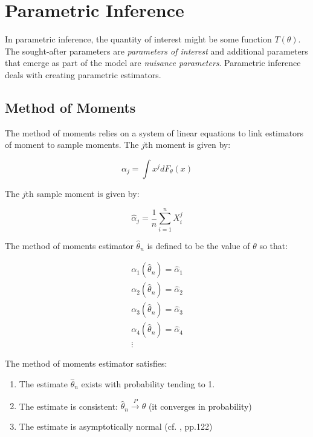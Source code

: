 \section{Parametric Inference}

In parametric inference, the quantity of interest might be some function $T(\theta)$. The sought-after parameters are \textit{parameters of interest} and additional parameters that emerge as part of the model are \textit{nuisance parameters}. Parametric inference deals with creating parametric estimators.

\subsection{Method of Moments}
The method of moments relies on a system of linear equations to link estimators of moment to sample moments. The $j$th moment is given by:

\begin{equation}
\alpha_j = \int x^j dF_{\theta}(x)
\end{equation}

The $j$th sample moment is given by:

\begin{equation}
\hat{\alpha}_j = \frac{1}{n} \sum_{i=1}^ n X_i^j
\end{equation}


The method of moments estimator $\hat{\theta}_n$ is defined to be the value of $\theta$ so that:

\begin{equation}
\begin{array}{l}
\alpha_1(\hat{\theta}_n) = \hat{\alpha}_1\\
\alpha_2(\hat{\theta}_n) = \hat{\alpha}_2\\
\alpha_3(\hat{\theta}_n) = \hat{\alpha}_3\\
\alpha_4(\hat{\theta}_n) = \hat{\alpha}_4\\
\vdots
\end{array}
\end{equation}

The method of moments estimator satisfies:

\begin{enumerate}
\item The estimate $\hat{\theta}_n$ exists with probability tending to 1.
\item The estimate is consistent: $\hat{\theta}_n \xrightarrow{P}\theta$ (it converges in probability)
\item The estimate is asymptotically normal (cf. \cite{wasserman2003all}, pp.122)
\end{enumerate}



